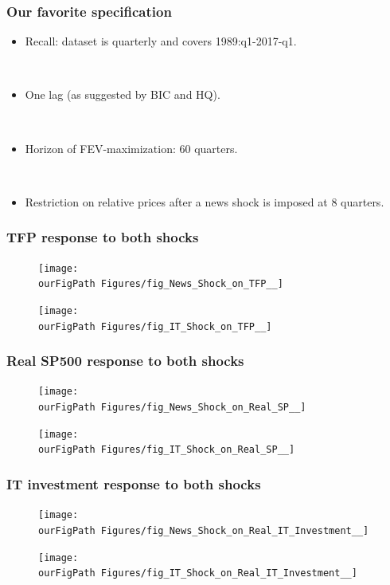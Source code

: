 \documentclass{beamer}
\def \ourFigPath {../../}
\begin{document}
\begin{frame}
	\frametitle{Our favorite specification}
	
	\begin{itemize}
	\item Recall: dataset is quarterly and covers 1989:q1-2017-q1.
	
	\
	
	\item One lag (as suggested by BIC and HQ).
	
	\
	
	\item Horizon of FEV-maximization: 60 quarters.
	
	\
	
	\item Restriction on relative prices after a news shock is imposed at 8 quarters.
	
	\end{itemize}


	
	
\end{frame}

\begin{frame}
\frametitle{TFP response to both shocks}
\begin{figure}
	\centering
	\texttt{[image: \\ourFigPath Figures/fig\_News\_Shock\_on\_TFP\_\_]}
\end{figure}
\begin{figure}
	\centering
	\texttt{[image: \\ourFigPath Figures/fig\_IT\_Shock\_on\_TFP\_\_]}
\end{figure}
\end{frame}

\begin{frame}
\frametitle{Real SP500 response to both shocks}
\begin{figure}
	\centering
	\texttt{[image: \\ourFigPath Figures/fig\_News\_Shock\_on\_Real\_SP\_\_]}
\end{figure}
\begin{figure}
	\centering
	\texttt{[image: \\ourFigPath Figures/fig\_IT\_Shock\_on\_Real\_SP\_\_]}
\end{figure}
\end{frame}

\begin{frame}
\frametitle{IT investment response to both shocks}
\begin{figure}
	\centering
	\texttt{[image: \\ourFigPath Figures/fig\_News\_Shock\_on\_Real\_IT\_Investment\_\_]}
\end{figure}
\begin{figure}
	\centering
	\texttt{[image: \\ourFigPath Figures/fig\_IT\_Shock\_on\_Real\_IT\_Investment\_\_]}
\end{figure}
\end{frame}
\end{document}
